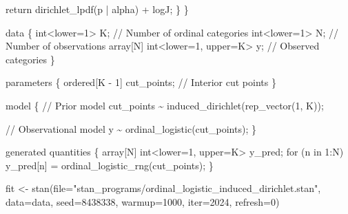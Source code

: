 \documentclass[
  letterpaper,
  DIV=11,
  numbers=noendperiod]{scrartcl}
\newenvironment{Shaded}{\begin{snugshade}}{\end{snugshade}}
\newcommand{\AttributeTok}[1]{\textcolor[rgb]{0.40,0.45,0.13}{#1}}
\newcommand{\CommentTok}[1]{\textcolor[rgb]{0.37,0.37,0.37}{#1}}
\newcommand{\ControlFlowTok}[1]{\textcolor[rgb]{0.00,0.23,0.31}{#1}}
\newcommand{\DataTypeTok}[1]{\textcolor[rgb]{0.68,0.00,0.00}{#1}}
\newcommand{\DecValTok}[1]{\textcolor[rgb]{0.68,0.00,0.00}{#1}}
\newcommand{\FunctionTok}[1]{\textcolor[rgb]{0.28,0.35,0.67}{#1}}
\newcommand{\KeywordTok}[1]{\textcolor[rgb]{0.00,0.23,0.31}{#1}}
\newcommand{\NormalTok}[1]{\textcolor[rgb]{0.00,0.23,0.31}{#1}}
\newcommand{\OtherTok}[1]{\textcolor[rgb]{0.00,0.23,0.31}{#1}}
\newcommand{\StringTok}[1]{\textcolor[rgb]{0.13,0.47,0.30}{#1}}
\begin{document}
\begin{codelisting}
\begin{Shaded}
\begin{Highlighting}[]
    \ControlFlowTok{return}\NormalTok{ dirichlet\_lpdf(p | alpha) + logJ;}
\NormalTok{  \}}
\NormalTok{\}}

\KeywordTok{data}\NormalTok{ \{}
  \DataTypeTok{int}\NormalTok{\textless{}}\KeywordTok{lower}\NormalTok{=}\DecValTok{1}\NormalTok{\textgreater{} K;                   }\CommentTok{// Number of ordinal categories}
  \DataTypeTok{int}\NormalTok{\textless{}}\KeywordTok{lower}\NormalTok{=}\DecValTok{1}\NormalTok{\textgreater{} N;                   }\CommentTok{// Number of observations}
  \DataTypeTok{array}\NormalTok{[N] }\DataTypeTok{int}\NormalTok{\textless{}}\KeywordTok{lower}\NormalTok{=}\DecValTok{1}\NormalTok{, }\KeywordTok{upper}\NormalTok{=K\textgreater{} y; }\CommentTok{// Observed categories}
\NormalTok{\}}

\KeywordTok{parameters}\NormalTok{ \{}
  \DataTypeTok{ordered}\NormalTok{[K {-} }\DecValTok{1}\NormalTok{] cut\_points; }\CommentTok{// Interior cut points}
\NormalTok{\}}

\KeywordTok{model}\NormalTok{ \{}
  \CommentTok{// Prior model}
\NormalTok{  cut\_points \textasciitilde{} induced\_dirichlet(rep\_vector(}\DecValTok{1}\NormalTok{, K));}

  \CommentTok{// Observational model}
\NormalTok{  y \textasciitilde{} ordinal\_logistic(cut\_points);}
\NormalTok{\}}

\KeywordTok{generated quantities}\NormalTok{ \{}
  \DataTypeTok{array}\NormalTok{[N] }\DataTypeTok{int}\NormalTok{\textless{}}\KeywordTok{lower}\NormalTok{=}\DecValTok{1}\NormalTok{, }\KeywordTok{upper}\NormalTok{=K\textgreater{} y\_pred;}
  \ControlFlowTok{for}\NormalTok{ (n }\ControlFlowTok{in} \DecValTok{1}\NormalTok{:N)}
\NormalTok{    y\_pred[n] = ordinal\_logistic\_rng(cut\_points);}
\NormalTok{\}}
\end{Highlighting}
\end{Shaded}

\end{codelisting}

\begin{Shaded}
\begin{Highlighting}[]
\NormalTok{fit }\OtherTok{\textless{}{-}} \FunctionTok{stan}\NormalTok{(}\AttributeTok{file=}\StringTok{"stan\_programs/ordinal\_logistic\_induced\_dirichlet.stan"}\NormalTok{,}
            \AttributeTok{data=}\NormalTok{data, }\AttributeTok{seed=}\DecValTok{8438338}\NormalTok{,}
            \AttributeTok{warmup=}\DecValTok{1000}\NormalTok{, }\AttributeTok{iter=}\DecValTok{2024}\NormalTok{, }\AttributeTok{refresh=}\DecValTok{0}\NormalTok{)}
\end{Highlighting}
\end{Shaded}
\end{document}
